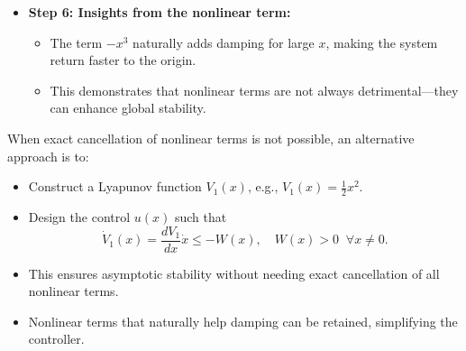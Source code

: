 \begin{example}
\begin{itemize}
    \item \textbf{Step 6: Insights from the nonlinear term:}  
    \begin{itemize}
        \item The term \(-x^3\) naturally adds damping for large \(x\), making the system return faster to the origin.  
        \item This demonstrates that nonlinear terms are not always detrimental—they can enhance global stability.  
    \end{itemize}
\end{itemize}
\end{example}

\begin{remark}
When exact cancellation of nonlinear terms is not possible, an alternative approach is to:

\begin{itemize}
    \item Construct a Lyapunov function \(V_1(x)\), e.g., \(V_1(x) = \frac{1}{2} x^2\).  
    \item Design the control \(u(x)\) such that
    \begin{equation}
    \dot{V}_1(x) = \frac{d V_1}{dx} \dot{x} \le - W(x), \quad W(x) > 0 \;\; \forall x \neq 0.
    \end{equation} 
    \item This ensures asymptotic stability without needing exact cancellation of all nonlinear terms.  
    \item Nonlinear terms that naturally help damping can be retained, simplifying the controller.
\end{itemize}
\end{remark}

